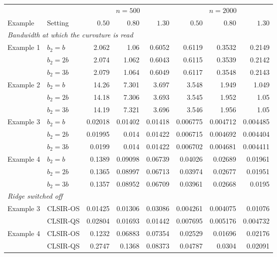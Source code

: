 \begin{tabular}{llrrrrrr}
\toprule
& & \multicolumn{3}{c}{$n=500$} & \multicolumn{3}{c}{$n=2000$}\\
\cmidrule(lr){3-5}\cmidrule(lr){6-8}
Example & Setting & $0.50$ & $0.80$ & $1.30$ & $0.50$ & $0.80$ & $1.30$\\
\midrule
\multicolumn{8}{l}{\emph{Bandwidth at which the curvature is read}}\\
Example 1 & $b_2=b$ & 2.062 & 1.06 & 0.6052 & 0.6119 & 0.3532 & 0.2149\\
 & $b_2=2b$ & 2.074 & 1.062 & 0.6043 & 0.6115 & 0.3539 & 0.2142\\
 & $b_2=3b$ & 2.079 & 1.064 & 0.6049 & 0.6117 & 0.3548 & 0.2143\\
\addlinespace
Example 2 & $b_2=b$ & 14.26 & 7.301 & 3.697 & 3.548 & 1.949 & 1.049\\
 & $b_2=2b$ & 14.18 & 7.306 & 3.693 & 3.545 & 1.952 & 1.05\\
 & $b_2=3b$ & 14.19 & 7.321 & 3.696 & 3.546 & 1.956 & 1.05\\
\addlinespace
Example 3 & $b_2=b$ & 0.02018 & 0.01402 & 0.01418 & 0.006775 & 0.004712 & 0.004485\\
 & $b_2=2b$ & 0.01995 & 0.014 & 0.01422 & 0.006715 & 0.004692 & 0.004404\\
 & $b_2=3b$ & 0.0199 & 0.014 & 0.01422 & 0.006702 & 0.004681 & 0.004411\\
\addlinespace
Example 4 & $b_2=b$ & 0.1389 & 0.09098 & 0.06739 & 0.04026 & 0.02689 & 0.01961\\
 & $b_2=2b$ & 0.1365 & 0.08997 & 0.06713 & 0.03974 & 0.02677 & 0.01951\\
 & $b_2=3b$ & 0.1357 & 0.08952 & 0.06709 & 0.03961 & 0.02668 & 0.0195\\
\midrule
\multicolumn{8}{l}{\emph{Ridge switched off}}\\
Example 3 & CLSIR-OS & 0.01425 & 0.01306 & 0.03086 & 0.004261 & 0.004075 & 0.01076\\
 & CLSIR-QS & 0.02804 & 0.01693 & 0.01442 & 0.007695 & 0.005176 & 0.004732\\
\addlinespace
Example 4 & CLSIR-OS & 0.1232 & 0.06883 & 0.07354 & 0.02529 & 0.01696 & 0.02176\\
 & CLSIR-QS & 0.2747 & 0.1368 & 0.08373 & 0.04787 & 0.0304 & 0.02091\\
\bottomrule
\end{tabular}